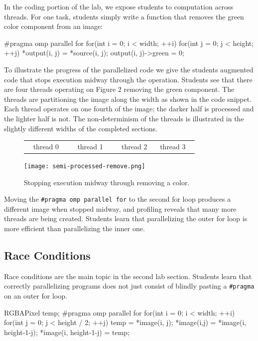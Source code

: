\documentclass[conference]{./IEEEtran}
\begin{document}
In the coding portion of the lab, we expose students to computation across
threads. For one task, students simply write a function that removes the green
color component from an image:

\begin{cppcode}
#pragma omp parallel for
for(int i = 0; i < width; ++i)
{
   for(int j = 0; j < height; ++j)
   {
      *output(i, j) = *source(i, j);
       output(i, j)->green = 0;
   }
}
\end{cppcode}

To illustrate the progress of the parallelized code we give the students
augmented code that stops execution midway through the operation.  Students see
that there are four threads operating on Figure 2 removing the
green component.  The threads are partitioning the image along the width as
shown in the code snippet.  Each thread operates on one fourth of the image; the
darker half is processed and the lighter half is not.  The non-determinism of
the threads is illustrated in the slightly different widths of the completed
sections.

\begin{figure}[here]
\label{fig:stripes}
\begin{center}
\begin{tabular}{c|c|c|c}
~ thread 0 ~ & ~ thread 1 ~ & ~ thread 2 & ~ thread 3 ~
\end{tabular}
\texttt{[image: semi-processed-remove.png]}
\caption{Stopping execution midway through removing a color.}
\end{center}
\end{figure}

Moving the \verb|#pragma omp parallel for| to the second for loop produces a
different image when stopped midway, and profiling reveals that many more
threads are being created. Students learn that parallelizing the outer for loop
is more efficient than parallelizing the inner one.

\subsection{Race Conditions}

Race conditions are the main topic in the second lab section. Students learn
that correctly parallelizing programs does not just consist of blindly pasting a
\verb|#pragma| on an outer for loop.

\begin{cppcode}
RGBAPixel temp;
#pragma omp parallel for
for(int i = 0; i < width; ++i)
{
   for(int j = 0; j < height / 2; ++j)
   {
      temp = *image(i, j);
      *image(i,j) = *image(i, height-1-j);
      *image(i, height-1-j) = temp;
   }
}
\end{cppcode}
\end{document}
